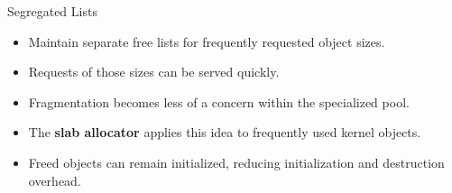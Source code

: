 \begin{frame}{Segregated Lists}


\begin{itemize}
    \item Maintain separate free lists for frequently requested object sizes.
    \item Requests of those sizes can be served quickly.
    \item Fragmentation becomes less of a concern within the specialized pool.
    \item The \textbf{slab allocator} applies this idea to frequently used
          kernel objects.
    \item Freed objects can remain initialized, reducing initialization
          and destruction overhead.
\end{itemize}




\end{frame}

